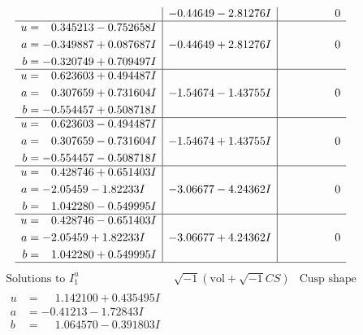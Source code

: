 \documentclass[1p]{elsarticle_modified}
\theoremstyle{definition}
\newcommand{\I}{\sqrt{-1}}
\begin{document}
$$\begin{array}{c|c|c}
 & -0.44649 - 2.81276 I & \phantom{-0.000000 } 0 \\ \hline\begin{aligned}
u &= \phantom{-}0.345213 - 0.752658 I \\
a &= -0.349887 + 0.087687 I \\
b &= -0.320749 + 0.709497 I\end{aligned}
 & -0.44649 + 2.81276 I & \phantom{-0.000000 } 0 \\ \hline\begin{aligned}
u &= \phantom{-}0.623603 + 0.494487 I \\
a &= \phantom{-}0.307659 + 0.731604 I \\
b &= -0.554457 + 0.508718 I\end{aligned}
 & -1.54674 - 1.43755 I & \phantom{-0.000000 } 0 \\ \hline\begin{aligned}
u &= \phantom{-}0.623603 - 0.494487 I \\
a &= \phantom{-}0.307659 - 0.731604 I \\
b &= -0.554457 - 0.508718 I\end{aligned}
 & -1.54674 + 1.43755 I & \phantom{-0.000000 } 0 \\ \hline\begin{aligned}
u &= \phantom{-}0.428746 + 0.651403 I \\
a &= -2.05459 - 1.82233 I \\
b &= \phantom{-}1.042280 - 0.549995 I\end{aligned}
 & -3.06677 - 4.24362 I & \phantom{-0.000000 } 0 \\ \hline\begin{aligned}
u &= \phantom{-}0.428746 - 0.651403 I \\
a &= -2.05459 + 1.82233 I \\
b &= \phantom{-}1.042280 + 0.549995 I\end{aligned}
 & -3.06677 + 4.24362 I & \phantom{-0.000000 } 0\\
 \hline 
 \end{array}$$\newpage$$\begin{array}{c|c|c}  
\text{Solutions to }I^u_{1}& \I (\text{vol} + \sqrt{-1}CS) & \text{Cusp shape}\\
 \hline 
\begin{aligned}
u &= \phantom{-}1.142100 + 0.435495 I \\
a &= -0.41213 - 1.72843 I \\
b &= \phantom{-}1.064570 - 0.391803 I\end{aligned}

\end{array}$$
\end{document}
